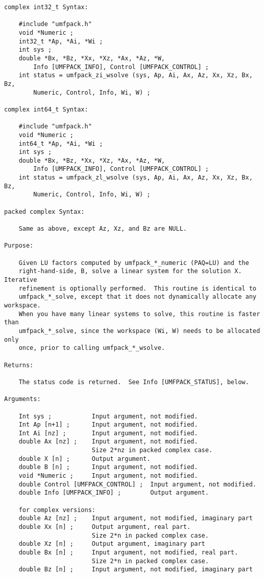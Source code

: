 \documentclass[11pt]{article}
\begin{document}
{\begin{verbatim}
complex int32_t Syntax:

    #include "umfpack.h"
    void *Numeric ;
    int32_t *Ap, *Ai, *Wi ; 
    int sys ;
    double *Bx, *Bz, *Xx, *Xz, *Ax, *Az, *W,
        Info [UMFPACK_INFO], Control [UMFPACK_CONTROL] ;
    int status = umfpack_zi_wsolve (sys, Ap, Ai, Ax, Az, Xx, Xz, Bx, Bz,
        Numeric, Control, Info, Wi, W) ;

complex int64_t Syntax:

    #include "umfpack.h"
    void *Numeric ;
    int64_t *Ap, *Ai, *Wi ;
    int sys ;
    double *Bx, *Bz, *Xx, *Xz, *Ax, *Az, *W,
        Info [UMFPACK_INFO], Control [UMFPACK_CONTROL] ;
    int status = umfpack_zl_wsolve (sys, Ap, Ai, Ax, Az, Xx, Xz, Bx, Bz,
        Numeric, Control, Info, Wi, W) ;

packed complex Syntax:

    Same as above, except Az, Xz, and Bz are NULL.

Purpose:

    Given LU factors computed by umfpack_*_numeric (PAQ=LU) and the
    right-hand-side, B, solve a linear system for the solution X.  Iterative
    refinement is optionally performed.  This routine is identical to
    umfpack_*_solve, except that it does not dynamically allocate any workspace.
    When you have many linear systems to solve, this routine is faster than
    umfpack_*_solve, since the workspace (Wi, W) needs to be allocated only
    once, prior to calling umfpack_*_wsolve.

Returns:

    The status code is returned.  See Info [UMFPACK_STATUS], below.

Arguments:

    Int sys ;           Input argument, not modified.
    Int Ap [n+1] ;      Input argument, not modified.
    Int Ai [nz] ;       Input argument, not modified.
    double Ax [nz] ;    Input argument, not modified.
                        Size 2*nz in packed complex case.
    double X [n] ;      Output argument.
    double B [n] ;      Input argument, not modified.
    void *Numeric ;     Input argument, not modified.
    double Control [UMFPACK_CONTROL] ;  Input argument, not modified.
    double Info [UMFPACK_INFO] ;        Output argument.

    for complex versions:
    double Az [nz] ;    Input argument, not modified, imaginary part
    double Xx [n] ;     Output argument, real part.
                        Size 2*n in packed complex case.
    double Xz [n] ;     Output argument, imaginary part
    double Bx [n] ;     Input argument, not modified, real part.
                        Size 2*n in packed complex case.
    double Bz [n] ;     Input argument, not modified, imaginary part


\end{verbatim}}
\end{document}

